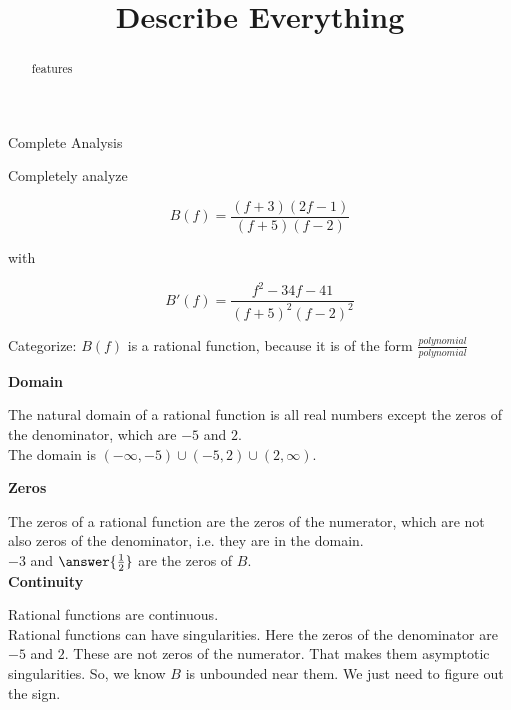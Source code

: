\documentclass{ximera}
\title{Describe Everything}
\begin{document}
\begin{abstract}
features
\end{abstract}
\maketitle





\begin{example}  Complete Analysis


Completely analyze   

\[   B(f) = \frac{(f+3)(2f-1)}{(f+5)(f-2)}        \]

with


\[
B'(f) = \frac{f^2 - 34f - 41}{(f+5)^2(f-2)^2}
\]





Categorize:  $B(f)$ is a rational function, because it is of the form $\frac{polynomial}{polynomial}$




\textbf{Domain}

The natural domain of a rational function is all real numbers except the zeros of the denominator, which are $-5$ and $2$. \\

The domain is $(-\infty, -5) \cup (-5, 2) \cup (2, \infty)$.







\textbf{Zeros}

The zeros of a rational function are the zeros of the numerator, which are not also zeros of the denominator, i.e. they are in the domain. \\





$-3$ and $\answer{\frac{1}{2}}$ are the zeros of $B$. \\





\textbf{Continuity}


Rational functions are continuous. \\

Rational functions can have singularities.  Here the zeros of the denominator are $-5$ and $2$.  These are not zeros of the numerator.  That makes them asymptotic singularities. So, we know $B$ is unbounded near them.  We just need to figure out the sign.\\



\end{example}
\end{document}
